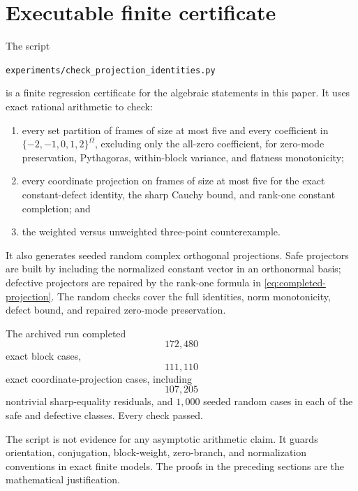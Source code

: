 \section{Executable finite certificate}
\label{sec:computational-certificate}

The script
\begin{center}
\texttt{experiments/check\_projection\_identities.py}
\end{center}
is a finite regression certificate for the algebraic statements in
this paper.  It uses exact rational arithmetic to check:

\begin{enumerate}[label=(\roman*),leftmargin=2.2em]
\item every set partition of frames of size at most five and every
  coefficient in \(\{-2,-1,0,1,2\}^\Omega\), excluding only the
  all-zero coefficient, for zero-mode preservation, Pythagoras,
  within-block variance, and flatness monotonicity;
\item every coordinate projection on frames of size at most five
  for the exact constant-defect identity, the sharp Cauchy bound,
  and rank-one constant completion; and
\item the weighted versus unweighted three-point counterexample.
\end{enumerate}

It also generates seeded random complex orthogonal projections.  Safe
projectors are built by including the normalized constant vector in
an orthonormal basis; defective projectors are repaired by the
rank-one formula in \eqref{eq:completed-projection}.  The random
checks cover the full identities, norm monotonicity, defect bound,
and repaired zero-mode preservation.

The archived run completed
\[
 172{,}480
\]
exact block cases,
\[
 111{,}110
\]
exact coordinate-projection cases, including
\[
 107{,}205
\]
nontrivial sharp-equality residuals, and \(1{,}000\) seeded random
cases in each of the safe and defective classes.  Every check
passed.

\begin{remark}
The script is not evidence for any asymptotic arithmetic claim.  It
guards orientation, conjugation, block-weight, zero-branch, and
normalization conventions in exact finite models.  The proofs in
the preceding sections are the mathematical justification.
\end{remark}
